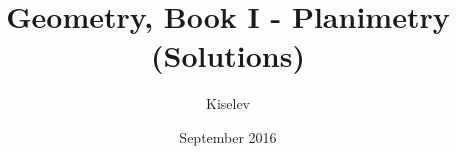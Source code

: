 \documentclass[a4paper,12pt]{book}
\begin{document}
\author{Kiselev}
\title{Geometry, Book I - Planimetry \\ (Solutions)}
\date{September 2016}

\frontmatter
\maketitle
\tableofcontents

\setcounter{chapter}{-1}

\mainmatter



\backmatter
\end{document}
